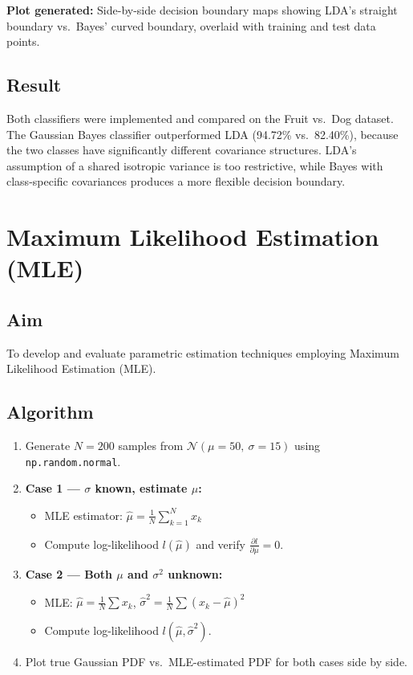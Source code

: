 \documentclass[12pt,a4paper]{article}
\begin{document}
\noindent \textbf{Plot generated:} Side-by-side decision boundary maps showing LDA's straight boundary
vs.\ Bayes' curved boundary, overlaid with training and test data points.

\subsection*{Result}
Both classifiers were implemented and compared on the Fruit vs.\ Dog dataset. The Gaussian Bayes
classifier outperformed LDA (94.72\% vs.\ 82.40\%), because the two classes have significantly
different covariance structures. LDA's assumption of a shared isotropic variance is too restrictive,
while Bayes with class-specific covariances produces a more flexible decision boundary.

\newpage

\section{Maximum Likelihood Estimation (MLE)}

\subsection*{Aim}
To develop and evaluate parametric estimation techniques employing Maximum Likelihood
Estimation (MLE).

\subsection*{Algorithm}
\begin{enumerate}[leftmargin=*, label=\arabic*.]
  \item Generate $N = 200$ samples from $\mathcal{N}(\mu=50,\ \sigma=15)$ using \texttt{np.random.normal}.
  \item \textbf{Case 1 --- $\sigma$ known, estimate $\mu$:}
    \begin{itemize}
      \item MLE estimator: $\hat{\mu} = \frac{1}{N}\sum_{k=1}^{N} x_k$
      \item Compute log-likelihood $l(\hat{\mu})$ and verify $\frac{\partial l}{\partial \mu} = 0$.
    \end{itemize}
  \item \textbf{Case 2 --- Both $\mu$ and $\sigma^2$ unknown:}
    \begin{itemize}
      \item MLE: $\hat{\mu} = \frac{1}{N}\sum x_k$, \quad $\hat{\sigma}^2 = \frac{1}{N}\sum(x_k - \hat{\mu})^2$
      \item Compute log-likelihood $l(\hat{\mu}, \hat{\sigma}^2)$.
    \end{itemize}
  \item Plot true Gaussian PDF vs.\ MLE-estimated PDF for both cases side by side.
\end{enumerate}
\end{document}
